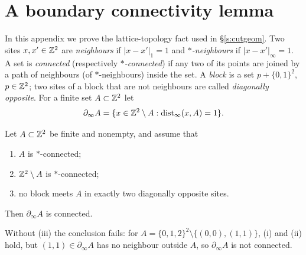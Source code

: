 \section{A boundary connectivity lemma}\label{s:topology}

In this appendix we prove the lattice-topology fact used in \S\ref{s:cutgeom}. Two sites $x, x' \in \mathbb{Z}^2$ are \emph{neighbours} if $|x - x'|_1 = 1$ and \emph{$*$-neighbours} if $|x - x'|_\infty = 1$. A set is \emph{connected} (respectively \emph{$*$-connected}) if any two of its points are joined by a path of neighbours (of $*$-neighbours) inside the set. A \emph{block} is a set $p + \{0, 1\}^2$, $p \in \mathbb{Z}^2$; two sites of a block that are not neighbours are called \emph{diagonally opposite}. For a finite set $A \subset \mathbb{Z}^2$ let
\begin{equation*}
\partial_\infty A = \{ x \in \mathbb{Z}^2 \setminus A : \operatorname{dist}_\infty(x, A) = 1 \} .
\end{equation*}

\begin{lemma}\label{l:boundaryconn}
Let $A \subset \mathbb{Z}^2$ be finite and nonempty, and assume that
\begin{enumerate}
\item[(i)] $A$ is $*$-connected;
\item[(ii)] $\mathbb{Z}^2 \setminus A$ is $*$-connected;
\item[(iii)] no block meets $A$ in exactly two diagonally opposite sites.
\end{enumerate}
Then $\partial_\infty A$ is connected.
\end{lemma}

Without (iii) the conclusion fails: for $A = \{0, 1, 2\}^2 \setminus \{(0, 0), (1, 1)\}$, (i) and (ii) hold, but $(1, 1) \in \partial_\infty A$ has no neighbour outside $A$, so $\partial_\infty A$ is not connected.

